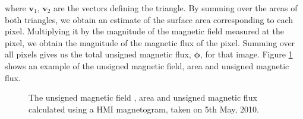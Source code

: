 \documentclass[11pt,a4paper,onecolumn]{report}
\begin{document}
where \(\bm{v}_1\), \(\bm{v}_2\) are the vectors defining the triangle. By
summing over the areas of both triangles, we obtain an estimate of the surface
area corresponding to each pixel. Multiplying it by the magnitude of the
magnetic field measured at the pixel, we obtain the magnitude of the magnetic
flux of the pixel. Summing over all pixels gives us the total unsigned magnetic
flux, \(\bm{\phi}\), for that image. Figure \ref{fig:tumf_calc} shows an example
of the unsigned magnetic field, area and unsigned magnetic flux.


\begin{figure}[t]%
  \centering
  \qquad
  \qquad
  \caption[]{The unsigned magnetic field , area
   and unsigned
  magnetic flux  calculated using a HMI magnetogram,
  taken on 5th May, 2010.}
  \label{fig:tumf_calc}
\end{figure}
\end{document}
